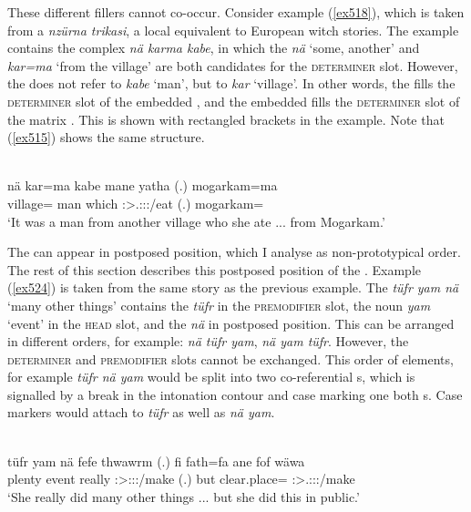 These different fillers cannot co-occur. Consider example (\ref{ex518}), which is taken from a \emph{nzürna trikasi}, a local equivalent to European witch stories. The example contains the complex  \emph{nä karma kabe}, in which the  \emph{nä} `some, another' and \emph{kar=ma} `from the village' are both candidates for the \textsc{determiner} slot. However, the  does not refer to \emph{kabe} `man', but to \emph{kar} `village'. In other words, the  fills the \textsc{determiner} slot of the embedded , and the embedded  fills the \textsc{determiner} slot of the matrix . This is shown with rectangled brackets in the example. Note that (\ref{ex515}) shows the same structure.

\begin{exe}
	\\
	\gll nä kar=ma kabe mane yatha (.) mogarkam=ma\\
	\Indf{} village=\Char{} man which \Stsg:\Sbj>\Tsg.\Masc:\Obj:\Pst:\Ipfv/eat (.) mogarkam=\Char{}\\
	\trans `It was a man from another village who she ate ... from Mogarkam.'\\
	\label{ex518}
\end{exe}

The  can appear in postposed position, which I analyse as non-prototypical order. The rest of this section describes this postposed position of the . Example (\ref{ex524}) is taken from the same story as the previous example. The  \emph{tüfr yam nä} `many other things' contains the  \emph{tüfr} in the \textsc{premodifier} slot, the noun \emph{yam} `event' in the \textsc{head} slot, and the  \emph{nä} in postposed position. This  can be arranged in different orders, for example: \emph{nä tüfr yam}, \emph{nä yam tüfr}. However, the \textsc{determiner} and \textsc{premodifier} slots cannot be exchanged. This order of elements, for example \emph{tüfr nä yam} would be split into two co-referential s, which is signalled by a break in the intonation contour and case marking one both s. Case markers would attach to \emph{tüfr} as well as \emph{nä yam}.

\begin{exe}
	\\
	\gll tüfr yam nä fefe thwawrm (.) fi fath=fa ane fof wäwa\\
	plenty event \Indf{} really \Sg:\Sbj>\Stpl:\Obj:\Pst:\Dur/make (.) but {clear.place=\Abl} \Dem{} \Emph{} \Sg:\Sbj>\Tsg.\F:\Obj:\Pst:\Ipfv/make\\
	\trans `She really did many other things ... but she did this in public.'\\
	\label{ex524}
\end{exe}

